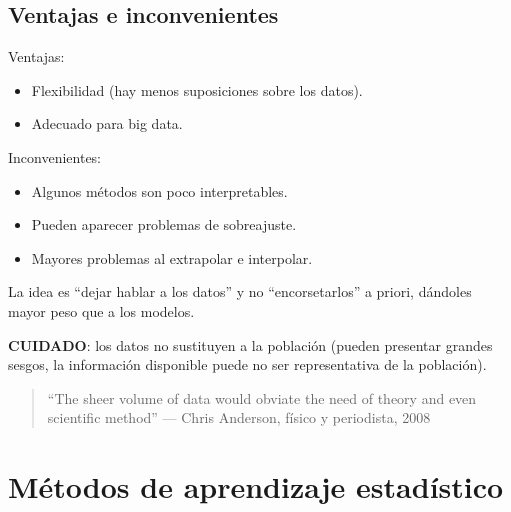 \documentclass[]{book}
\begin{document}
\subsection{Ventajas e inconvenientes}\label{ventajas-e-inconvenientes}

Ventajas:

\begin{itemize}
\item
  Flexibilidad (hay menos suposiciones sobre los datos).
\item
  Adecuado para big data.
\end{itemize}

Inconvenientes:

\begin{itemize}
\item
  Algunos métodos son poco interpretables.
\item
  Pueden aparecer problemas de sobreajuste.
\item
  Mayores problemas al extrapolar e interpolar.
\end{itemize}

La idea es ``dejar hablar a los datos'' y no ``encorsetarlos'' a priori,
dándoles mayor peso que a los modelos.

\textbf{CUIDADO}: los datos no sustituyen a la población (pueden
presentar grandes sesgos, la información disponible puede no ser
representativa de la población).

\begin{quote}
``The sheer volume of data would obviate the need of theory and even
scientific method'' --- Chris Anderson, físico y periodista, 2008
\end{quote}

\section{Métodos de aprendizaje
estadístico}\label{metodos-de-aprendizaje-estadistico}
\end{document}
